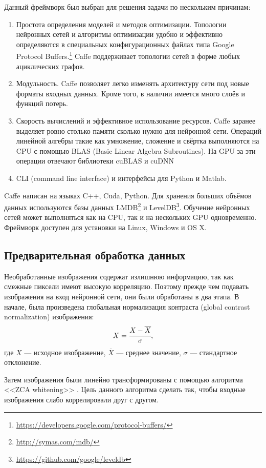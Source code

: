 Данный фреймворк был выбран для решения задачи по нескольким причинам:
\begin{enumerate}
    \item Простота определения моделей и методов оптимизации. Топологии нейронных сетей и алгоритмы оптимизации удобно и 
    эффективно определяются в специальных конфигурационных файлах типа Google Protocol 
    Buffers.\footnote{\url{https://developers.google.com/protocol-buffers/}} Caffe поддерживает топологии сетей в форме любых 
    ациклических графов.
    \item Модульность. Caffe позволяет легко изменять архитектуру сети под новые форматы входных данных. Кроме того, в наличии 
    имеется много слоёв и функций потерь.
    \item Скорость вычислений и эффективное использование ресурсов. Caffe заранее выделяет ровно столько памяти сколько нужно для 
    нейронной сети. Операций линейной алгебры такие как умножение, сложение и свёртка выполняются на CPU с помощью BLAS (Basic 
    Linear Algebra Subroutines). На GPU за эти операции отвечают библиотеки cuBLAS и cuDNN 
    \cite{DBLP:journals/corr/ChetlurWVCTCS14}
    \item CLI (command line interface) и интерфейсы для Python и Matlab.
\end{enumerate}

Caffe написан на языках C++, Cuda, Python. Для хранения больших объёмов данных используются базы данных 
LMDB\footnote{\url{http://symas.com/mdb/}} и LevelDB\footnote{\url{https://github.com/google/leveldb}}. Обучение нейронных сетей 
может выполняться как на CPU, так и на нескольких GPU одновременно. Фреймворк доступен для установки на Linux, Windows и OS X.

\subsection{Предварительная обработка данных}
Необработанные изображения содержат излишнюю информацию, так как смежные пиксели имеют высокую корреляцию. Поэтому прежде чем 
подавать изображения на вход нейронной сети, они были обработаны в два этапа. В начале, была произведена глобальная нормализация контраста
(global contrast normalization) изображения:
\[ X = \cfrac{X - \overline{X}}{\sigma},\]
где $X$ --- исходное изображение, $\overline{X}$ --- среднее значение, $\sigma$ --- стандартное отклонение.

Затем изображения были линейно трансформированы с помощью алгоритма <<ZCA whitening>> \cite{learningmultiple}.
Цель данного алгоритма сделать так, чтобы входные изображения слабо коррелировали друг с другом.

